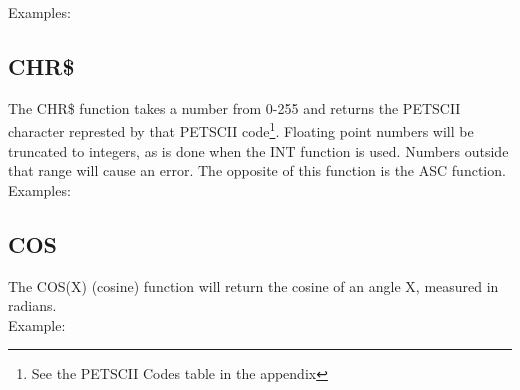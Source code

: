 Examples:\\


\subsection{CHR\$}

The {\ttfamily CHR\$} function takes a number from 0-255 and returns the
PETSCII character represted by that PETSCII code\footnote{See the PETSCII Codes
table in the appendix}.  Floating point numbers will be truncated to integers,
as is done when the {\ttfamily INT} function is used.  Numbers outside that
range will cause an error.  The opposite of this function is the {\ttfamily
ASC} function.\\

Examples:\\


\subsection{COS}

The {\ttfamily COS(X)} (cosine) function will return the cosine of an angle
{\ttfamily X}, measured in radians.\\

Example:\\


